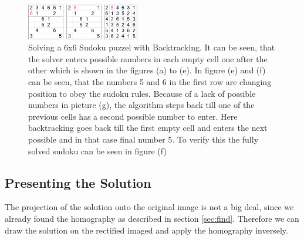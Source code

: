 \documentclass[
a4paper,     %
12pt         %
]{scrartcl}  %
\begin{document}
\begin{figure}[h!btp]
     \begin{minipage}[h]{1.62cm}
       \includegraphics[height=1.55cm]{imgs/backtracking7.png}
       \subcaption{}
     \end{minipage}     
     \begin{minipage}[h]{1.62cm}
       \includegraphics[height=1.55cm]{imgs/backtracking8.png}       
       \subcaption{}
     \end{minipage}     
     \begin{minipage}[h]{1.62cm}
       \includegraphics[height=1.55cm]{imgs/backtracking9.png}
       \subcaption{}
     \end{minipage}     
      \caption[Solving a 6x6 Sudoku puzzel with Backtracking]{\scriptsize{Solving a 6x6 Sudoku puzzel with Backtracking. 
        It can be seen, that the solver enters possible numbers in each empty cell one after the other which is shown in 
        the figures (a) to (e). In figure (e) and (f) can be seen, that the numbers 5 and 6 in the first row are 
        changing position to obey the sudoku rules. Because of a lack of possible numbers in picture (g), the algorithm steps
        back till one of the previous cells has a second possible number to enter. Here backtracking goes back till the first
        empty cell and enters the next possible and in that case final number 5. To verify this the fully solved sudoku can be
        seen in figure (f)}}
   \label{fig:backtracking}
\end{figure} 

\subsection{Presenting the Solution}

The projection of the solution onto the original image is not a big deal, since we already
found the homography as described in section \ref{sec:find}. Therefore we can draw the solution
on the rectified imaged and apply the homography inversely.
\end{document}

